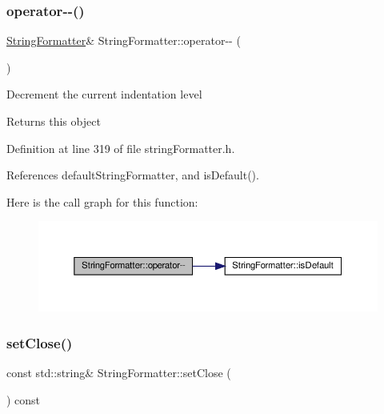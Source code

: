 \subsubsection{\texorpdfstring{operator-\/-\/()}{operator--()}}
{\footnotesize\ttfamily \hyperlink{classStringFormatter}{String\+Formatter}\& String\+Formatter\+::operator-\/-\/ (\begin{DoxyParamCaption}{ }\end{DoxyParamCaption})\hspace{0.3cm}{\ttfamily [inline]}}

Decrement the current indentation level \begin{DoxyReturn}{Returns}
this object 
\end{DoxyReturn}


Definition at line 319 of file string\+Formatter.\+h.



References default\+String\+Formatter, and is\+Default().

Here is the call graph for this function\+:
\nopagebreak
\begin{figure}[H]
\begin{center}
\leavevmode
\includegraphics[width=350pt]{classStringFormatter_adb0e8aad266a4a8f68a6ff6db7dbe231_cgraph}
\end{center}
\end{figure}
\mbox{\label{classStringFormatter_acfc112049e763b2ced09e1f30c151244}} 
\subsubsection{\texorpdfstring{set\+Close()}{setClose()}\hspace{0.1cm}{\footnotesize\ttfamily [1/2]}}
{\footnotesize\ttfamily const std\+::string\& String\+Formatter\+::set\+Close (\begin{DoxyParamCaption}{ }\end{DoxyParamCaption}) const\hspace{0.3cm}{\ttfamily [inline]}}

